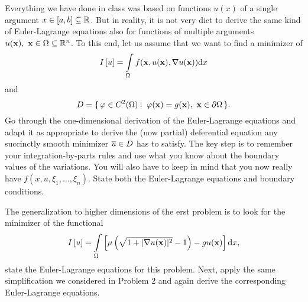 \documentclass[12pt]{memoir}
\begin{document}
\begin{Ej}
    Everything we have done in class was based on functions $u(x)$ of a
single argument $x\in\left\lbrack a,b\right\rbrack\subseteq\mathbb{R}$. But in reality, it is not very dict to derive the same kind of Euler-Lagrange
equations also for functions of multiple arguments $u(\mathbf{x}),\ \mathbf{x}\in\Omega\subseteq\mathbb{R}^n$.
To this end, let us assume that we want to find a minimizer of
$$I\left\lbrack u\right\rbrack=\int\limits_\Omega f(\mathbf{x},u(\mathbf{x}),\nabla u(\mathbf{x}))\dd x$$
and
$$D=\{\,\varphi\in C^2(\Omega)\mathbin{:}\ \varphi(\mathbf{x})=g(\mathbf{x}),\ \mathbf{x}\in\partial\Omega\,\}.$$
Go through the one-dimensional derivation of the Euler-Lagrange equations and adapt it as appropriate to
derive the (now partial) deferential equation any succinctly smooth minimizer $\overline u\in D$ has to satisfy. The
key step is to remember your integration-by-parts rules and use what you know about the boundary values
of the variations. You will also have to keep in mind that you now really have $f(x, u,\xi_1,\dots,\xi_n)$.
State both the Euler-Lagrange equations and boundary conditions.
\end{Ej}

\begin{Ej}
    The generalization to higher dimensions of the erst problem is to
look for the minimizer of the functional
$$I\left\lbrack u\right\rbrack=\int\limits_\Omega\left\lbrack\mu\left(\sqrt{1+|\nabla u(\mathbf{x})|^2}-1\right)-gu(\mathbf{x})\right\rbrack\dd x,$$
state the Euler-Lagrange equations for this problem.
Next, apply the same simplification we considered in Problem 2 and again derive the corresponding
Euler-Lagrange equations.
\end{Ej}
\end{document}
